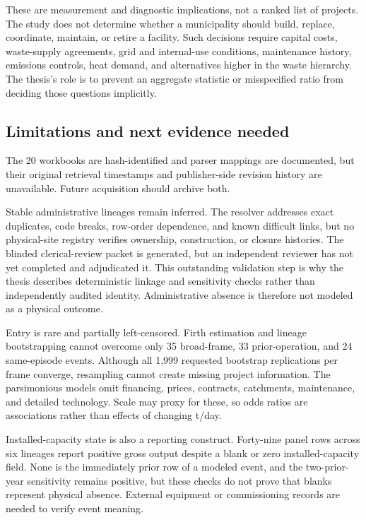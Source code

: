 \documentclass[12pt,letterpaper]{article}
\begin{document}
These are measurement and diagnostic implications, not a ranked list of
projects. The study does not determine whether a municipality should build,
replace, coordinate, maintain, or retire a facility. Such decisions require
capital costs, waste-supply agreements, grid and internal-use conditions,
maintenance history, emissions controls, heat demand, and alternatives higher
in the waste hierarchy. The thesis's role is to prevent an aggregate statistic
or misspecified ratio from deciding those questions implicitly.

\subsection{Limitations and next evidence needed}

The 20 workbooks are hash-identified and parser mappings are documented, but
their original retrieval timestamps and publisher-side revision history are
unavailable. Future acquisition should archive both.

Stable administrative lineages remain inferred. The resolver addresses exact
duplicates, code breaks, row-order dependence, and known difficult links, but no
physical-site registry verifies ownership, construction, or closure histories.
The blinded clerical-review packet is generated, but an independent reviewer has
not yet completed and adjudicated it. This outstanding validation step is
why the thesis describes deterministic linkage and sensitivity checks rather
than independently audited identity. Administrative absence is therefore not
modeled as a physical outcome.

Entry is rare and partially left-censored. Firth estimation and lineage
bootstrapping cannot overcome only 35 broad-frame, 33 prior-operation, and 24
same-episode events. Although all 1,999 requested bootstrap replications per
frame converge, resampling cannot create missing project information. The
parsimonious models omit financing, prices, contracts, catchments, maintenance,
and detailed technology. Scale may
proxy for these, so odds ratios are associations rather than effects of changing
t/day.

Installed-capacity state is also a reporting construct. Forty-nine panel rows
across six lineages report positive gross output despite a blank or zero
installed-capacity field. None is the immediately prior row of a modeled event,
and the two-prior-year sensitivity remains positive, but these checks do not
prove that blanks represent physical absence. External equipment or
commissioning records are needed to verify event meaning.
\end{document}
